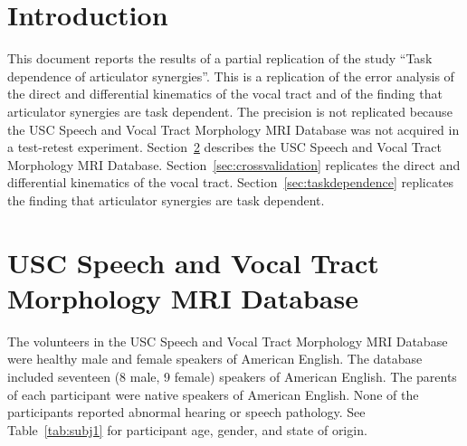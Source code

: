 \documentclass[reprint]{JASAnew}\usepackage[]{graphicx}\usepackage[]{color}
\begin{document}
\section{Introduction}

This document reports the results of a partial replication of the study ``Task dependence of articulator synergies''. This is a replication of the error analysis of the direct and differential kinematics of the vocal tract and of the finding that articulator synergies are task dependent. The precision is not replicated because the USC Speech and Vocal Tract Morphology MRI Database was not acquired in a test-retest experiment. Section~\ref{sec:database} describes the USC Speech and Vocal Tract Morphology MRI Database. Section~\ref{sec:crossvalidation} replicates the direct and differential kinematics of the vocal tract. Section~\ref{sec:taskdependence} replicates the finding that articulator synergies are task dependent. 

\section{USC Speech and Vocal Tract Morphology MRI Database}
\label{sec:database}


The volunteers in the USC Speech and Vocal Tract Morphology MRI Database~\citep{sorensen2017database} were healthy male and female speakers of American English.
%
The database included seventeen (8 male, 9 female) speakers of American English. The parents of each participant were native speakers of American English. None of the participants reported abnormal hearing or speech pathology. See Table~\ref{tab:subj1} for participant age, gender, and state of origin. 
\end{document}

